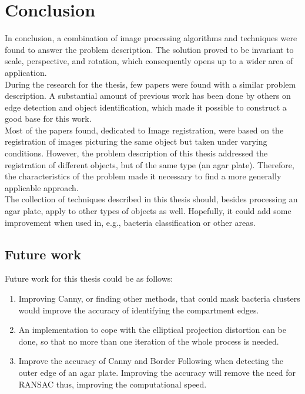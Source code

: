 
\chapter{Conclusion}
\label{cha:conclusion}
In conclusion, a combination of image processing algorithms and techniques were found to answer the problem description. The solution proved to be invariant to scale, perspective, and rotation, which consequently opens up to a wider area of application. \\

\noindent During the research for the thesis, few papers were found with a similar problem description. A substantial amount of previous work has been done by others on edge detection and object identification, which made it possible to construct a good base for this work. \\

\noindent Most of the papers found, dedicated to Image registration, were based on the registration of images picturing the same object but taken under varying conditions. However, the problem description of this thesis addressed the registration of different objects, but of the same type (an agar plate). Therefore, the characteristics of the problem made it necessary to find a more generally applicable approach. \\ 

\noindent The collection of techniques described in this thesis should, besides processing an agar plate, apply to other types of objects as well. Hopefully, it could add some improvement when used in, e.g., bacteria classification or other areas.

\section{Future work}
Future work for this thesis could be as follows: 
\begin{enumerate}
    \item Improving Canny, or finding other methods, that could mask bacteria clusters would improve the accuracy of identifying the compartment edges. 
    \item An implementation to cope with the elliptical projection distortion can be done, so that no more than one iteration of the whole process is needed. 
    \item Improve the accuracy of Canny and Border Following when detecting the outer edge of an agar plate. Improving the accuracy will remove the need for RANSAC thus, improving the computational speed. 
\end{enumerate}



